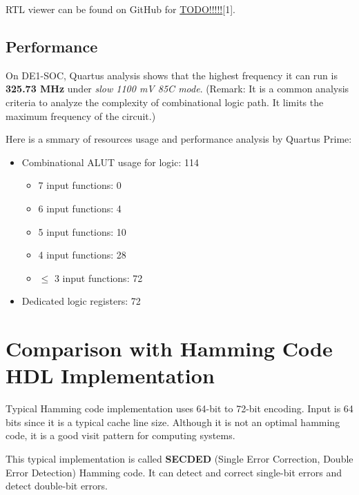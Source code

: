 \documentclass[conference]{IEEEtran}
\begin{document}
RTL viewer can be found on GitHub for \href{https://github.com/luckunately/ELEC433-Projects}{TODO!!!!!}[1]. 
\subsection{Performance}
On DE1-SOC, Quartus analysis shows that the highest frequency it can run is \textbf{325.73 MHz} under \textit{slow 1100 mV 85C mode}. (Remark: It is a common analysis criteria to analyze the complexity of combinational logic path. It limits the maximum frequency of the circuit.)

Here is a smmary of resources usage and performance analysis by Quartus Prime:
\begin{itemize}
  \item Combinational ALUT usage for logic: 114 \begin{itemize}
    \item 7 input functions: 0
    \item 6 input functions: 4
    \item 5 input functions: 10
    \item 4 input functions: 28
    \item $\leq$ 3 input functions: 72
  \end{itemize}
  \item Dedicated logic registers: 72
\end{itemize}

\section{Comparison with Hamming Code HDL Implementation}
Typical Hamming code implementation uses 64-bit to 72-bit encoding. Input is 64
bits since it is a typical cache line size. Although it is not an optimal
hamming code, it is a good visit pattern for computing systems.

This typical implementation is called \textbf{SECDED} (Single Error Correction,
Double Error Detection) Hamming code. It can detect and correct single-bit
errors and detect double-bit errors.
\end{document}
